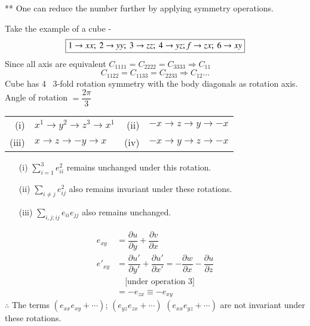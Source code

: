 ** One can reduce the number further by applying symmetry operations.

\begin{example*}
Take the example of a cube - 
$$
\fbox{$1\to xx; \ 2\to yy; \ 3\to zz; \ 4\to yz; f\to zx; \ 6\to xy$}
$$
Since all axis are equivalent $C_{1111}=C_{2222}=C_{3333}\Rightarrow C_{11}$
$$
C_{1122}=C_{1133}=C_{2233}\Rightarrow C_{12}\ldots
$$
Cube has 4 \ 3-fold rotation symmetry with the body diagonals as rotation axis. Angle of rotation $=\dfrac{2\pi}{3}$
\begin{center}
\begin{tabular}{rl@{\qquad}rl}
(i) & $x^{1}\to y^{2}\to z^{3}\to x^{1}$ & (ii) & $-x\to z\to y\to -x$\\[3pt]
(iii) & $x\to z\to -y\to x$ & (iv) & $-x\to y\to z\to -x$
\end{tabular}
\end{center}
\begin{itemize}
\item[(i)] $\sum\limits^{3}_{i=1}e^{2}_{ii}$ remains unchanged under this rotation.

\item[(ii)] $\sum\limits_{i\neq j}e^{2}_{ij}$ also remains invariant under these rotations.

\item[(iii)] $\sum\limits_{i,j; ij}e_{ii}e_{jj}$ also remains unchanged.
\end{itemize}
\begin{align*}
e_{xy} &=\dfrac{\partial u}{\partial y}+\dfrac{\partial v}{\partial x}\\
e'_{xy} &=\dfrac{\partial u'}{\partial y'}+\dfrac{\partial u'}{\partial x'}=-\dfrac{\partial w}{\partial x}-\dfrac{\partial u}{\partial z}\\
&\quad \text{[under operation 3]}\\
&= -e_{zx}\equiv -e_{xy}
\end{align*}
$\therefore$ The terms $(e_{xx}e_{xy}+\cdots)$; $(e_{yz}e_{zx}+\cdots)$ $(e_{xx}e_{yz}+\cdots)$ are not invariant under these rotations.


\end{example*}
